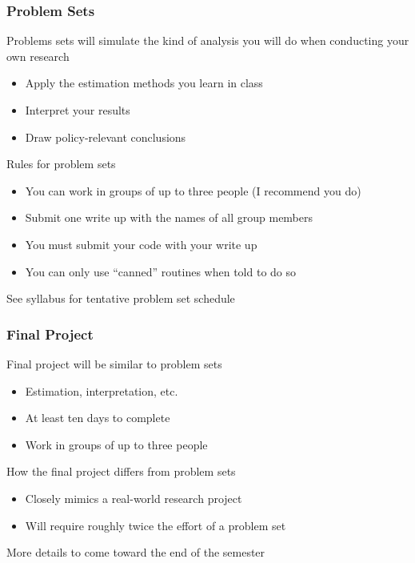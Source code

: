 \documentclass{beamer}
\begin{document}
\begin{frame}\frametitle{Problem Sets}
    Problems sets will simulate the kind of analysis you will do when conducting your own research
    \begin{itemize}
        \item Apply the estimation methods you learn in class
        \item Interpret your results
        \item Draw policy-relevant conclusions
    \end{itemize}
    \vspace{2ex}
    Rules for problem sets
    \begin{itemize}
        \item You can work in groups of up to three people (I recommend you do)
        \item Submit one write up with the names of all group members
        \item You must submit your code with your write up
        \item You can only use ``canned'' routines when told to do so
    \end{itemize}
    \vspace{2ex}
    See syllabus for tentative problem set schedule
\end{frame}

\begin{frame}\frametitle{Final Project}
    Final project will be similar to problem sets
    \begin{itemize}
        \item Estimation, interpretation, etc.
        \item At least ten days to complete
        \item Work in groups of up to three people
    \end{itemize}
    \vspace{2ex}
    How the final project differs from problem sets
    \begin{itemize}
        \item Closely mimics a real-world research project
        \item Will require roughly twice the effort of a problem set
    \end{itemize}
    \vspace{2ex}
    More details to come toward the end of the semester
\end{frame}
\end{document}
